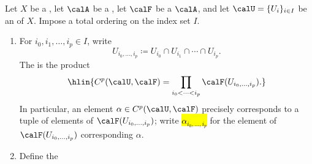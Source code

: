 \begin{definition} \label{definition:cech_cohomology_of_a_sheaf_of_abelian_groups_on_a_topological_space}
    Let $X$ be a , let $\calA$ be a , let $\calF$ be a  $\calA$, and let $\calU = \{U_i\}_{i \in I}$ be an  of $X$. Impose a total ordering on the index set $I$. 
    \begin{enumerate}
        \item For $i_0,i_1,\ldots,i_p \in I$, write 
        $$U_{i_0,\ldots,i_p} \coloneq U_{i_0} \cap U_{i_1} \cap \cdots \cap U_{i_p}.$$
        The  is the product
        $$\hlin{C^p(\calU, \calF) = \prod_{i_0 < \cdots < i_p} \calF(U_{i_0,\ldots,i_p}).}$$
        In particular, an element $\alpha \in C^p(\calU, \calF)$ precisely corresponds to a tuple of elements of $\calF(U_{i_0,\ldots,i_p})$; write \hl{$\alpha_{i_0,\ldots,i_p}$} for the element of $\calF(U_{i_0,\ldots,i_p})$ corresponding $\alpha$.




        \item Define the  



\end{enumerate}
\end{definition}
